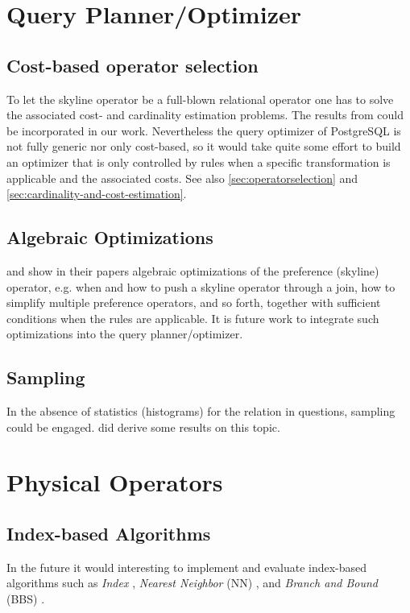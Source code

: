\section{Query Planner/Optimizer}
\subsection{Cost-based operator selection}
\label{sec:cost-based-operator-selection}
To let the skyline operator be a full-blown relational operator one has
to solve the associated cost- and cardinality estimation problems.
The results from \citet{Chaudhuri2006} could be incorporated in our
work.  Nevertheless the query optimizer of PostgreSQL is not fully
generic nor only cost-based, so it would take quite some effort to
build an optimizer that is only controlled by rules when a specific
transformation is applicable and the associated costs. See
also \autoref{sec:operatorselection} and \ref{sec:cardinality-and-cost-estimation}.

\subsection{Algebraic Optimizations}
\citet{Chomicki2003a} and \citet{Kiessling2003} show in their
papers algebraic optimizations of the preference (skyline) operator,
e.g. when and how to push a skyline operator through a join, how to
simplify multiple preference operators, and so forth, together with
sufficient conditions when the rules are applicable.  It is future
work to integrate such optimizations into the query planner/optimizer.

\subsection{Sampling}
\label{sec:sampling}
In the absence of statistics (histograms) for the relation in
questions, sampling could be engaged. \citet{Chaudhuri2006} did
derive some results on this topic.

\section{Physical Operators}
\subsection{Index-based Algorithms}
In the future it would interesting to implement and evaluate index-based algorithms 
such as 
{\em Index} \citep{Tan2001}, 
{\em Nearest Neighbor} (NN) \citep{Kossmann2002}, and
{\em Branch and Bound} (BBS) \citep{Papadias2003, Papadias2005}.


